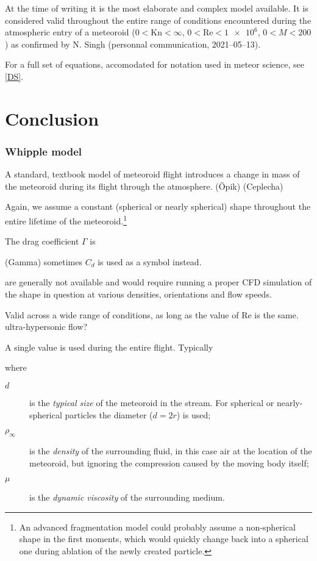             At the time of writing it is the most elaborate and complex model available.
            It is considered valid throughout the entire range of
            conditions encountered during the atmospheric entry of a meteoroid
            ($0 < \mathrm{Kn} < \infty$, $0 < \mathrm{Re} < \num{1e6}$, $0 < M < 200$)
            as confirmed by N. Singh (personnal communication, 2021--05--13).

            For a full set of equations, accomodated for notation used in meteor science, see \cref{DS}.

\section{Conclusion} \label{dc}

    \subsubsection{Whipple model} \label{mmw}
        A standard, textbook model of meteoroid flight introduces a change in mass of the meteoroid
        during its flight through the atmosphere. 
        (Öpik) (Ceplecha)

        Again, we assume a constant (spherical or nearly spherical) shape throughout the entire
        lifetime of the meteoroid.\footnote{An advanced fragmentation model could probably assume a non-spherical
        shape in the first moments, which would quickly change back into a spherical one during ablation
        of the newly created particle.}

        The drag coefficient $\Gamma$ is 

        (Gamma) sometimes $C_d$ is used as a symbol instead.

        are generally not available and would require running a proper CFD simulation
        of the shape in question at various densities, orientations and flow speeds.

        Valid across a wide range of conditions, as long as the value of Re is the same.
        ultra-hypersonic flow?

        A single value is used during the entire flight. Typically


        where
        \begin{description}
            \item[$d$] is the \emph{typical size} of the meteoroid in the stream.
                For spherical or nearly-spherical particles the diameter ($d = 2r$) is used;
            \item[$\rho_\infty$] is the \emph{density} of the surrounding fluid, in this case
                air at the location of the meteoroid, but ignoring the compression caused
                by the moving body itself;
            \item[$\mu$] is the \emph{dynamic viscosity} of the surrounding medium.
        \end{description}

